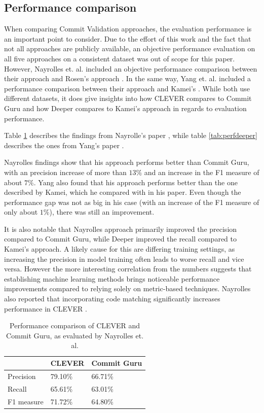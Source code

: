 \subsection{Performance comparison}

When comparing Commit Validation approaches, the evaluation performance is an important point to consider. Due to the effort of this work and the fact that not all approaches are publicly available, an objective performance evaluation on all five approaches on a consistent dataset was out of scope for this paper. However, Nayrolles et. al. included an objective performance comparison between their approach and Rosen's approach \cite{Nayrolles2018}. In the same 
way, %
Yang et. al. included a performance comparison between their approach and Kamei's \cite{Yang2015}. While both use different datasets, it does give insights into how CLEVER compares to Commit Guru and how Deeper compares to Kamei's approach in regards to evaluation performance.

Table \ref{tab:perfclever} describes the findings from Nayrolle's paper \cite{Nayrolles2018}, while table \ref{tab:perfdeeper} describes the ones from Yang's paper \cite{Yang2015}.

Nayrolles findings show that his approach performs better than Commit Guru, with an precision increase of more than $13\%$ and an increase in the F1 measure of about $7\%$. Yang also found that his approach performs better than the one described by Kamei, which he compared with in his paper. Even though the performance gap was not as big in his case (with an increase of the F1 measure of only about $1\%$), there was still an improvement. 

It is also notable that Nayrolles approach primarily improved the precision compared to Commit Guru, while Deeper improved the recall compared to Kamei's approach. A likely cause for this are differing training settings, as increasing the precision in model training often leads to worse recall and vice versa. However the more interesting correlation from the numbers suggests that establishing machine learning methods brings noticeable performance improvements compared to relying solely on metric-based techniques. Nayrolles also reported that incorporating code matching significantly increases performance in CLEVER \cite{Nayrolles2018}.

\begin{table}[t]
	\centering
	\begin{tabular}{l|l|l|}
		\cline{2-3}
		& CLEVER  & Commit Guru \\ \hline
		\multicolumn{1}{|l|}{Precision}  & 79.10\% & 66.71\%     \\ \hline
		\multicolumn{1}{|l|}{Recall}     & 65.61\% & 63.01\%     \\ \hline
		\multicolumn{1}{|l|}{F1 measure} & 71.72\% & 64.80\%     \\ \hline
	\end{tabular}
	\caption{Performance comparison of CLEVER and Commit Guru, as evaluated by Nayrolles et. al. \cite{Nayrolles2018}}
	\label{tab:perfclever}
\end{table}

